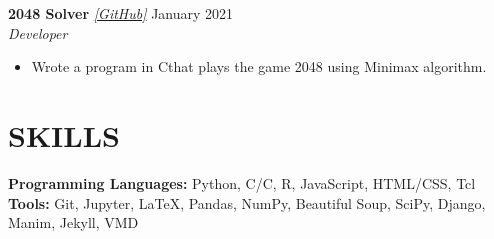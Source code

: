 \documentclass[letterpaper, 9pt]{extarticle}
\newcommand{\CPP}{C\nolinebreak\hspace{-.05em}\raisebox{.4ex}{\tiny\bf +}\nolinebreak\hspace{-.10em}\raisebox{.4ex}{\tiny\bf +}}
\begin{document}
\noindent
\textbf{2048 Solver} 
\emph{\href{https://github.com/AdenChen27/2048_solver}{\color{blue} [GitHub]}}
\hfill January 2021 \\
\textit{Developer} 
\begin{itemize}
    \item Wrote a program in \CPP \space that plays the game 2048 using Minimax algorithm. 
\end{itemize}




   

\section*{SKILLS}
\textbf{Programming Languages:} Python, C/\CPP\@, R, JavaScript, HTML/CSS, Tcl \\
\textbf{Tools:} Git, Jupyter, \LaTeX, Pandas, NumPy, Beautiful Soup, SciPy, Django, Manim, Jekyll, VMD
\end{document}
